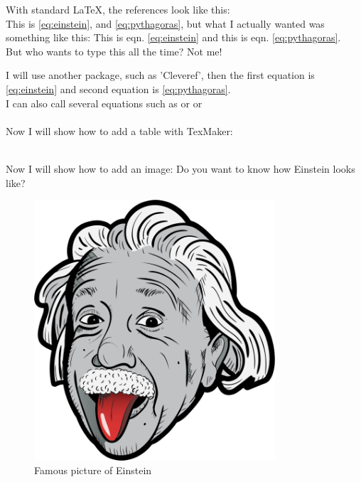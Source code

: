 \documentclass[a4paper]{article} %
\begin{document}
With standard \LaTeX, the references look like this:\\
This is \ref{eq:einstein}, and \ref{eq:pythagoras}, but what I actually wanted was something like this: This is eqn. \ref{eq:einstein} and this is eqn. \ref{eq:pythagoras}.\\
But who wants to type this all the time? Not me!

I will use another package, such as 'Cleveref', then the first equation is \cref{eq:einstein} and second equation is \cref{eq:pythagoras}.\\
I can also call several equations such as  or  or 
\\

\hrulefill\\

Now I will show how to add a table with TexMaker:



\hrulefill\\

Now I will show how to add an image:
Do you want to know how Einstein looks like?\\

\begin{figure}[H] %
	\center
	\includegraphics[width=0.8\textwidth]{./img/einstein.png}
	\caption{Famous picture of Einstein}
	\label{fig:einstein}
\end{figure}
\end{document}
